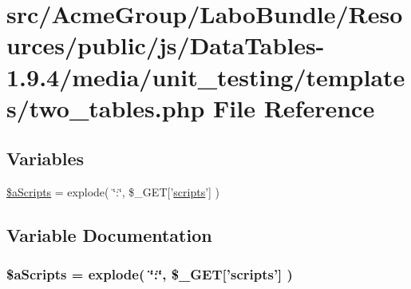 \hypertarget{two__tables_8php}{\section{src/\+Acme\+Group/\+Labo\+Bundle/\+Resources/public/js/\+Data\+Tables-\/1.9.4/media/unit\+\_\+testing/templates/two\+\_\+tables.php File Reference}
\label{two__tables_8php}
}
\subsection*{Variables}
\begin{DoxyCompactItemize}
\item 
\hyperlink{two__tables_8php_a3e8e1608000c9afdd05327fc2b06b056}{\$a\+Scripts} = explode( \char`\"{}\+:\char`\"{}, \$\+\_\+\+G\+E\+T\mbox{[}'\hyperlink{tinymce_8jquery_8dev_8js_a09066d4d580eeec222f858d588b4cdef}{scripts}'\mbox{]} )
\end{DoxyCompactItemize}


\subsection{Variable Documentation}
\hypertarget{two__tables_8php_a3e8e1608000c9afdd05327fc2b06b056}{
\subsubsection[{\$a\+Scripts}]{\setlength{\rightskip}{0pt plus 5cm}\$a\+Scripts = explode( \char`\"{}\+:\char`\"{}, \$\+\_\+\+G\+E\+T\mbox{[}'{\bf scripts}'\mbox{]} )}}\label{two__tables_8php_a3e8e1608000c9afdd05327fc2b06b056}
